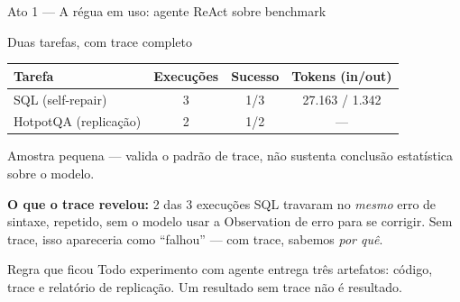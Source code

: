 \documentclass{beamer}
\newenvironment{numerobloco}[1]{\begin{block}{#1}}{\end{block}}
\newenvironment{decisaobloco}[1]{\begin{alertblock}{#1}}{\end{alertblock}}
\begin{document}
\begin{frame}{Ato 1 --- A régua em uso: agente ReAct sobre benchmark}
  \small
  \begin{numerobloco}{Duas tarefas, com trace completo}
    \begin{center}
    \begin{tabular}{lccc}
      \toprule
      \textbf{Tarefa} & \textbf{Execuções} & \textbf{Sucesso} & \textbf{Tokens (in/out)} \\
      \midrule
      SQL (self-repair)     & 3 & 1/3 & 27.163 / 1.342 \\
      HotpotQA (replicação) & 2 & 1/2 & --- \\
      \bottomrule
    \end{tabular}
    \end{center}
    \footnotesize Amostra pequena --- valida o padrão de trace, não sustenta conclusão
    estatística sobre o modelo.
  \end{numerobloco}

  \pause
  \textbf{O que o trace revelou:} 2 das 3 execuções SQL travaram no \emph{mesmo} erro de
  sintaxe, repetido, sem o modelo usar a Observation de erro para se corrigir. Sem
  trace, isso apareceria como ``falhou'' --- com trace, sabemos \emph{por quê}.

  \pause
  \begin{decisaobloco}{Regra que ficou}
    Todo experimento com agente entrega três artefatos: código, trace e relatório de
    replicação. Um resultado sem trace não é resultado.
  \end{decisaobloco}
\end{frame}
\end{document}

